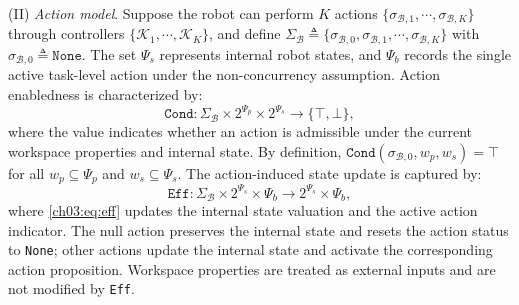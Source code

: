 (II) \emph{Action model}.
 Suppose the robot can perform
$K$ actions
$\{\sigma_{\mathcal{B},1}, \cdots, \sigma_{\mathcal{B},K}\}$ through
controllers $\{\mathcal{K}_1, \cdots, \mathcal{K}_K\}$, and define
$\Sigma_{\mathcal{B}} \triangleq
\{\sigma_{\mathcal{B},0}, \sigma_{\mathcal{B},1}, \cdots,
  \sigma_{\mathcal{B},K}\}$ with
$\sigma_{\mathcal{B},0} \triangleq \texttt{None}$. The set $\Psi_s$ represents
internal robot states, and $\Psi_b$ records the single active task-level action
under the non-concurrency assumption. Action enabledness is characterized by:
\begin{equation}
\label{ch03:eq:cond}
\texttt{Cond} :
\Sigma_{\mathcal{B}} \times 2^{\Psi_p} \times 2^{\Psi_s}
\longrightarrow \{\top,\bot\},
\end{equation}
where the value indicates whether an action is admissible under the current
workspace properties and internal state. By definition,
$\texttt{Cond}(\sigma_{\mathcal{B},0}, w_p, w_s)=\top$ for all
$w_p \subseteq \Psi_p$ and $w_s \subseteq \Psi_s$. The action-induced state
update is captured by:
\begin{equation}
\label{ch03:eq:eff}
\texttt{Eff} :
\Sigma_{\mathcal{B}} \times 2^{\Psi_s} \times \Psi_b
\longrightarrow 2^{\Psi_s} \times \Psi_b,
\end{equation}
where \eqref{ch03:eq:eff} updates the internal state valuation and the active
action indicator. The null action preserves the internal state and resets the
action status to \texttt{None}; other actions update the internal state and
activate the corresponding action proposition. Workspace properties are treated
as external inputs and are not modified by \texttt{Eff}.

